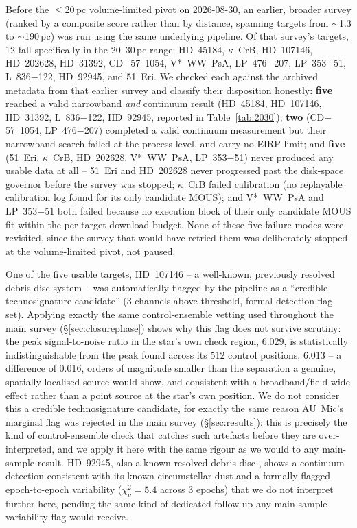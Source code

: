 \documentclass{openjournal}
\begin{document}
Before the $\leq$20\,pc volume-limited pivot on 2026-08-30, an earlier,
broader survey (ranked by a composite score rather than by distance,
spanning targets from $\sim$1.3 to $\sim$190\,pc) was run using the same
underlying pipeline. Of that survey's targets, 12 fall specifically in
the 20--30\,pc range: HD~45184, $\kappa$~CrB, HD~107146, HD~202628,
HD~31392, CD$-$57~1054, V*~WW~PsA, LP~476$-$207, LP~353$-$51,
L~836$-$122, HD~92945, and 51~Eri. We checked each against the archived
metadata from that earlier survey and classify their disposition
honestly: \textbf{five} reached a valid narrowband \emph{and} continuum
result (HD~45184, HD~107146, HD~31392, L~836$-$122, HD~92945, reported
in Table~\ref{tab:2030}); \textbf{two} (CD$-$57~1054, LP~476$-$207)
completed a valid continuum measurement but their narrowband search
failed at the process level, and carry no EIRP limit; and
\textbf{five} (51~Eri, $\kappa$~CrB, HD~202628, V*~WW~PsA, LP~353$-$51)
never produced any usable data at all -- 51~Eri and HD~202628 never
progressed past the disk-space governor before the survey was stopped;
$\kappa$~CrB failed calibration (no replayable calibration log found for
its only candidate MOUS); and V*~WW~PsA and LP~353$-$51 both failed
because no execution block of their only candidate MOUS fit within the
per-target download budget. None of these five failure modes were
revisited, since the survey that would have retried them was
deliberately stopped at the volume-limited pivot, not paused.

One of the five usable targets, HD~107146 -- a well-known, previously
resolved debris-disc system \citep{Ardila2004} -- was automatically
flagged by the pipeline as a ``credible technosignature candidate'' (3
channels above threshold, formal detection flag set). Applying exactly
the same control-ensemble vetting used throughout the main survey
(\S\ref{sec:closurephase}) shows why this flag does not survive scrutiny:
the peak signal-to-noise ratio in the star's own check region, 6.029, is
statistically indistinguishable from the peak found across its 512
control positions, 6.013 -- a difference of 0.016, orders of magnitude
smaller than the separation a genuine, spatially-localised source would
show, and consistent with a broadband/field-wide effect rather than a
point source at the star's own position. We do not consider this a
credible technosignature candidate, for exactly the same reason AU~Mic's
marginal flag was rejected in the main survey (\S\ref{sec:results}):
this is precisely the kind of control-ensemble check that catches such
artefacts before they are over-interpreted, and we apply it here with
the same rigour as we would to any main-sample result. HD~92945, also a
known resolved debris disc \citep{Golimowski2011}, shows a continuum
detection consistent with its known circumstellar dust and a formally
flagged epoch-to-epoch variability ($\chi^2_\nu=5.4$ across 3 epochs)
that we do not interpret further here, pending the same kind of
dedicated follow-up any main-sample variability flag would receive.
\end{document}
